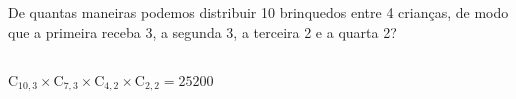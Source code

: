 \begin{ex}
 De quantas maneiras podemos distribuir 10 brinquedos entre 4 crianças, de modo que a primeira receba 3, a segunda 3, a terceira 2 e a quarta 2?
 \begin{sol}
     \phantom{A} \\
 $\text{C}_{{10},3}\times \text{C}_{7,3} \times \text{C}_{4,2} \times \text{C}_{2,2}=25200$
 \end{sol}
\end{ex}